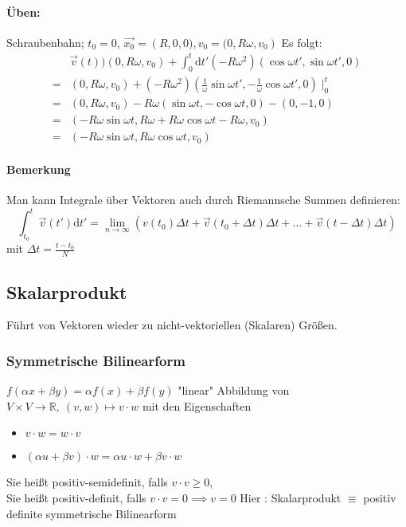 \documentclass[a4paper]{scrartcl}
\theoremstyle{definition}
\theoremstyle{plain}
\theoremstyle{remark}
\theoremstyle{remark}
\begin{document}
\paragraph{Üben:}
\label{sec-2-5-1-2}
Schraubenbahn; $t_0 = 0$, $\vec{x_0} = \left(R, 0, 0), v_0 = (0, R\omega, v_0\right)$
Es folgt:
\begin{align*}
&\vec{v}(t) ) (0, R\omega, v_0) + \int_0^t \mathrm{d}t' ( -R\omega^2)(\cos{\omega t', \sin{\omega t'}, 0})\\
=& (0, R\omega, v_0) + (-R\omega^2)(\frac{1}{\omega}\sin{\omega t'}, -\frac{1}{\omega}\cos{\omega t'}, 0)\mid_0^t\\
=& (0, R\omega, v_0) - R\omega (\sin{\omega t}, -\cos{\omega t}, 0) - (0, -1, 0)\\
=& (-R\omega\sin{\omega t}, R\omega + R\omega\cos{\omega t} - R\omega, v_0)\\
=& (-R\omega\sin{\omega t}, R\omega\cos{\omega t}, v_0)
\end{align*}
\paragraph{Bemerkung}
\label{sec-2-5-1-3}
Man kann Integrale über Vektoren auch durch Riemannsche Summen definieren:
\[\int_{t_0}^t \vec{v}(t')\mathrm{d}t' = \lim_{n\to\infty} (v(t_0)\Delta t + \vec{v}(t_0 + \Delta t)\Delta t + \ldots + \vec{v}(t - \Delta t)\Delta t)\]
mit $\Delta t = \frac{t - t_0}{N}$
\subsection{Skalarprodukt}
\label{sec-2-6}
Führt von Vektoren wieder zu nicht-vektoriellen (Skalaren) Größen.
\subsubsection{Symmetrische Bilinearform}
\label{sec-2-6-1}
$f(\alpha x + \beta y) = \alpha f(x) + \beta f(y)$ "linear"
Abbildung von $V\times V \to \mathbb{R},~(v,w) \mapsto v\cdot w$ mit den Eigenschaften
\begin{itemize}
\item $v\cdot w = w\cdot v$
\item $(\alpha u + \beta v) \cdot w = \alpha u\cdot w + \beta v\cdot w$
\end{itemize}
Sie heißt positiv-semidefinit, falls  $v\cdot v\geq 0$, \\
        Sie heißt positiv-definit, falls  $v\cdot v = 0 \implies v = 0$
Hier : Skalarprodukt $\equiv$ positiv definite symmetrische Bilinearform
\end{document}
